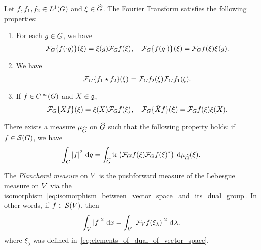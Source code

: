 \begin{proposition}
\label{proposition:elementary_properties_of_the_Fourier_transform}
    Let $f, f_1, f_2 \in \Lebesgue{1}{\Group}$ and $\xi \in \dualGroup\Group$.
    The Fourier Transform satisfies the following properties:
    \begin{enumerate}
        \item For each $g \in \Group$, we have
            \begin{align*}
                \Fourier \{f(\dummy g)\} (\xi)
                = \xi(g) \Fourier f(\xi), \quad
                \Fourier \{f(g \dummy)\} (\xi)
                = \Fourier f(\xi) \xi(g).
            \end{align*}
        \item We have
            \begin{align*}
                \Fourier \{\conv{f_1}{f_2}\}(\xi)
                = \Fourier f_2(\xi) \Fourier f_1(\xi).
            \end{align*}
        \item If $f \in \SmoothFunctions\Group$ and $X \in \LieAlgebra$,
            \begin{align*}
                \Fourier \{\LeftDifferentialOperatorFirstOrder{X} f\}(\xi)
                = \xi(X) \Fourier f(\xi), \quad
                \Fourier \{\RightDifferentialOperatorFirstOrder{X} f\}(\xi)
                = \Fourier f(\xi) \xi(X).
            \end{align*}
    \end{enumerate}
\end{proposition}

\begin{proposition}
    There exists a measure $\Plancherel\Group$ on $\dualGroup\Group$ such that the following property holds:
    if $f \in \Schwartz\Group$, we have
    \begin{align*}
        \int_\Group \abs{f}^2 \dd g
        = \int_{\dualGroup\Group} \tr \left( \Fourier f(\xi) \adj{\Fourier f(\xi)} \right) \dd \Plancherel\Group(\xi).
    \end{align*}
\end{proposition}

\begin{example}
    The \emph{Plancherel measure} on $\VectorSpace$ is the pushforward measure of the Lebesgue measure on $\VectorSpace$ via the isomorphism~\eqref{eq:isomorphism_between_vector_space_and_its_dual_group}.
    In other words, if $f \in \Schwartz\VectorSpace$, then
    \begin{align*}
        \int_\VectorSpace \abs{f}^2 \dd x = \int_\VectorSpace \abs{\Fourier[\VectorSpace] f(\xi_\lambda)}^2 \dd \lambda,
    \end{align*}
    where $\xi_\lambda$ was defined in~\eqref{eq:elements_of_dual_of_vector_space}.
\end{example}

